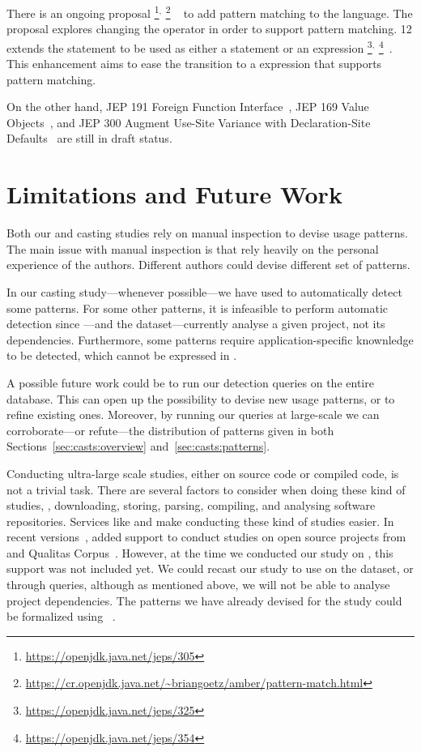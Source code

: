 There is an ongoing proposal%
\footnote{\url{https://openjdk.java.net/jeps/305}}$^{,}$%
\footnote{\url{https://cr.openjdk.java.net/~briangoetz/amber/pattern-match.html}}%
~\citep{jep305} to add pattern matching to the \java{} language.
The proposal explores changing the  operator in order to support pattern matching.
\java{} 12 extends the  statement to be used as either a statement or an expression%
\footnote{\url{https://openjdk.java.net/jeps/325}}$^{,}$%
\footnote{\url{https://openjdk.java.net/jeps/354}}~\citep{jep325,jep354}.
This enhancement aims to ease the transition to a  expression that supports pattern matching.

On the other hand,
JEP 191 Foreign Function Interface~\citep{jep191},
JEP 169 Value Objects~\citep{jep169}, and
JEP 300 Augment Use-Site Variance with Declaration-Site Defaults~\citep{jep300}
are still in draft status.

\section{Limitations and Future Work}

Both our \unsafe{} and casting studies rely on manual inspection to devise usage patterns.
The main issue with manual inspection is that rely heavily on the personal experience of the authors.
Different authors could devise different set of patterns.

In our casting study---whenever possible---we have used \ql{} to automatically detect some patterns.
For some other patterns, it is infeasible to perform automatic detection since \ql{}---and the \lgtm{} dataset---currently analyse a given project,
not its dependencies.
Furthermore, some patterns require application-specific knownledge to be detected,
which cannot be expressed in \ql{}.

A possible future work could be to run our detection queries on the entire \lgtm{} database.
This can open up the possibility to devise new usage patterns,
or to refine existing ones.
Moreover,
by running our queries at large-scale we can corroborate---or refute---the distribution of patterns given in both Sections~\ref{sec:casts:overview} and~\ref{sec:casts:patterns}.

Conducting ultra-large scale studies, either on source code or compiled code, is not a trivial task.
There are several factors to consider when doing these kind of studies,
\eg{}, downloading, storing, parsing, compiling,
and analysing software repositories.
Services like \boa{} and \lgtm{} make conducting these kind of studies easier.
In recent versions~\citep{boa-github},
\boa{} added support to conduct studies on open source projects from \github{} and Qualitas Corpus~\citep{temperoQualitasCorpusCurated2010}.
However, at the time we conducted our study on \unsafe{},
this support was not included yet.
We could recast our \unsafe{} study to use \boa{} on the \github{} dataset,
or \lgtm{} through \ql{} queries, although as mentioned above,
we will not be able to analyse project dependencies.
The patterns we have already devised for the \unsafe{} study could be formalized using \ql{}~\citep{avgustinovQLObjectorientedQueries2016}.

